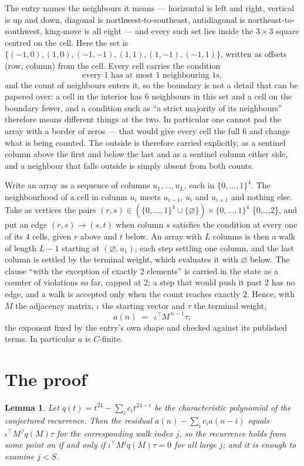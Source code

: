\documentclass[11pt,a4paper]{article}
\theoremstyle{plain}
\newtheorem{lemma}[theorem]{Lemma}
\theoremstyle{definition}
\begin{document}
The entry names the neighbours it means --- horizontal is left and right, vertical is up and
down, diagonal is northwest-to-southeast, antidiagonal is northeast-to-southwest, king-move is
all eight --- and every such set lies inside the $3\times3$ square centred on the cell. Here
the set is $\{(-1,0), (1,0), (-1,-1), (1,1), (1,-1), (-1,1)\}$, written as offsets (row, column) from the cell. Every cell carries
the condition
\[
\text{every 1 has at most 1 neighbouring 1s},
\]
and the count of neighbours enters it, so the boundary is not a detail that can be papered
over: a cell in the interior has $6$ neighbours in this set and a cell on the boundary
fewer, and a condition such as ``a strict majority of its neighbours'' therefore means
different things at the two. In particular one cannot pad the array with a border of zeros ---
that would give every cell the full $6$ and change what is being counted. The outside is
therefore carried
explicitly, as a sentinel column above the first and below the last and as a sentinel column
either side, and a neighbour that falls outside is simply absent from both counts.

Write an array as a sequence of columns $u_1,\dots,u_L$, each in
$\{0,\dots,1\}^{4}$. The neighbourhood of a cell in column $u_i$ meets $u_{i-1}$,
$u_i$ and $u_{i+1}$ and nothing else. Take as vertices the pairs
$(r,s)\in(\{0,\dots,1\}^{4}\cup\{\varnothing\})\times\{0,\dots,1\}^{4}$ \times \{0,\dots,2\},
and put an edge $(r,s)\to(s,t)$ when column $s$ satisfies the condition at every one of its
$4$ cells, given $r$ above and $t$ below. An array with $L$ columns is then a walk of length
$L-1$ starting at $(\varnothing,u_1)$, each step settling one column, and the last column is
settled by the terminal weight, which evaluates it with $\varnothing$ below. The clause ``with the exception of exactly $2$ elements'' is carried in
the state as a counter of violations so far, capped at $2$; a step that would push it past
$2$ has no edge, and a walk is accepted only when the count reaches exactly $2$. Hence,
with $M$ the adjacency matrix, $\iota$ the starting vector and $\tau$ the terminal weight,
\[
a(n)\;=\;\,\iota^{\!\top}M^{\,n-1}\tau ,
\]
the exponent fixed by the entry's own shape and checked against its published terms. In
particular $a$ is $C$-finite.

\section{The proof}

\begin{lemma}\label{lem:crit}
Let $q(t)=t^{24}-\sum_i c_it^{24-i}$ be the characteristic polynomial of the
conjectured recurrence. Then the residual $a(n)-\sum_ic_ia(n-i)$ equals
$\iota^{\!\top}M^{\,j}q(M)\tau$ for the corresponding walk index $j$, so the
recurrence holds from some point on if and only if $\iota^{\!\top}M^{j}q(M)\tau=0$ for all
large $j$; and it is enough to examine $j<S$.
\end{lemma}
\end{document}
